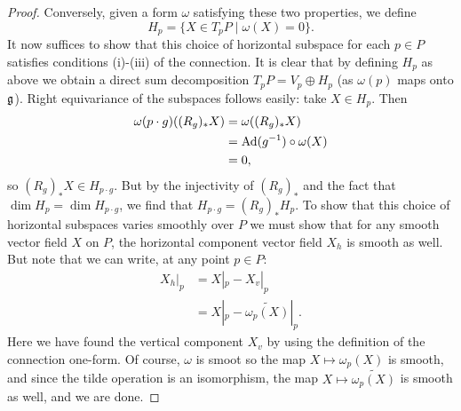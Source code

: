 \begin{proof}
Conversely, given a form $\omega$ satisfying these two properties, we define
\[H_p=\{X\in T_pP\mid \omega(X)=0\}.\]
It now suffices to show that this choice of horizontal subspace for each $p\in P$ satisfies conditions (i)-(iii) of the connection.
It is clear that by defining $H_p$ as above we obtain a direct sum decomposition $T_pP=V_p\oplus H_p$ (as $\omega(p)$ maps onto $\mathfrak g$). Right equivariance of the subspaces follows easily: take $X\in H_p$. Then
\begin{align*}
\omega(p\cdot g)((R_g)_*X)&=\omega((R_g)_*X)\\
&=\operatorname{Ad}(g^{-1})\circ\omega(X)\\
&=0,
\end{align*}
so $(R_g)_*X\in H_{p\cdot g}$. But by the injectivity of $(R_g)_*$ and the fact that $\dim H_p=\dim H_{p\cdot g}$, we find that $H_{p\cdot g}=(R_g)_*H_p$.
To show that this choice of horizontal subspaces varies smoothly over $P$ we must show that for any smooth vector field $X$ on $P$, the horizontal component vector field $X_h$ is smooth as well. But note that we can write, at any point $p\in P$:
\begin{align*}
X_h|_p&=X|_p-X_v|_p\\
&=X|_p-\widetilde{\omega_p(X)}|_p.
\end{align*}
Here we have found the vertical component $X_v$ by using the definition of the connection one-form.
Of course, $\omega$ is smoot so the map $X\mapsto \omega_p(X)$ is smooth, and since the tilde operation is an isomorphism, the map $X\mapsto \widetilde{\omega_p(X)}$ is smooth as well, and we are done.
\end{proof}






